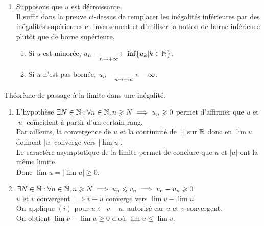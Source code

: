\documentclass{article}
\begin{document}
\begin{question_kholle}
\begin{enumerate}
		\item Supposons que $u$ est décroissante. \\
		      Il suffit dans la preuve ci-dessus de remplacer les inégalités inférieures par des inégalités supérieures et inversement et d'utiliser la notion de borne inférieure plutôt que de borne supérieure.
		      \begin{enumerate}[label=($\roman*$)]
			      \item Si $u$ est minorée, $u_n \ \xrightarrow[\;n \to +\infty\;]{}\  \inf\{u_k|k\in\mathbb N\}$.
			      \item Si $u$ n'est pas bornée, $u_n \ \xrightarrow[\;n \to +\infty\;]{}\  -\infty$.
		      \end{enumerate}
	\end{enumerate}
\end{question_kholle}

	{Théorème de passage à la limite dans une inégalité.}
	~\smallbreak
	\begin{enumerate}[label=($\roman*$)]
		\item L'hypothèse $\exists N \in \mathbb N : \forall n \in \mathbb N, n \geqslant N \implies u_{n} \geqslant 0$ permet d'affirmer que $u$ et $|u|$ coïncident à partir d'un certain rang. \\
		      Par ailleurs, la convergence de $u$ et la continuité de $|\cdot|$ sur $\mathbb R$ donc en $\lim u$ donnent $|u|$ converge vers $|\lim u|$. \\
		      Le caractère asymptotique de la limite permet de conclure que $u$ et $|u|$ ont la même limite. \\
		      Donc $\lim u = |\lim u| \geqslant 0$.
		\item $\exists N \in \mathbb N : \forall n \in \mathbb N, n \geqslant N \implies u_{n} \leqslant v_{n} \implies v_{n} - u_{n} \geqslant 0$ \\
		      $u$ et $v$ convergent $\implies v-u$ converge vers $\lim v - \lim u$. \\
		      On applique $(i)$ pour $u \leftarrow v - u$, autorisé car $u \text{ et }v$ convergent. \\
		      On obtient $\lim v - \lim u \geqslant 0$ d'où $\lim u \leqslant \lim v$.
	\end{enumerate}
\end{question_kholle}
\end{document}
